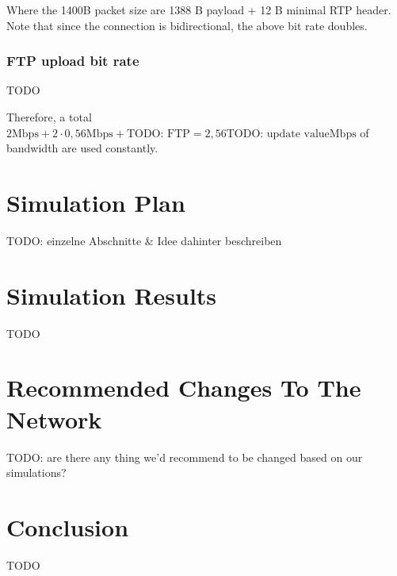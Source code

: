 \documentclass[
10pt, %
a4paper, %
oneside, %
headinclude,footinclude, %
BCOR5mm, %
]{scrartcl}
\begin{document}
Where the 1400B packet size are 1388 B payload + 12 B minimal RTP header. Note that since the connection is bidirectional, the above bit rate doubles.

\subsubsection{FTP upload bit rate}
TODO


Therefore, a total $2\text{Mbps} + 2 \cdot 0,56 \text{Mbps} + \text{TODO: FTP} = 2,56 \text{TODO: update value} \text{Mbps}$ of bandwidth are used constantly.



\section{Simulation Plan}
\label{sec:sim_plan}

TODO: einzelne Abschnitte \& Idee dahinter beschreiben

\section{Simulation Results}
TODO

\section{Recommended Changes To The Network}
TODO: are there any thing we'd recommend to be changed based on our simulations?

\section{Conclusion}
TODO

\newpage

\listoffigures %

\listoftables %


\renewcommand{\refname}{\spacedlowsmallcaps{References}} %




\end{document}
